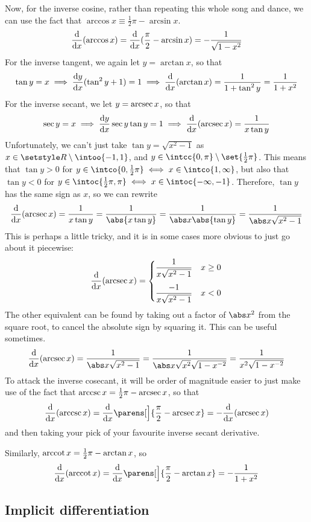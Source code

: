Now, for the inverse cosine, rather than repeating this whole song and
dance, we can use the fact that
\(\arccos x \equiv \frac 12 \pi - \arcsin x\).
\begin{equation*}
\dv{x}(\arccos x) = \dv{x}(\frac \pi 2 - \arcsin x)
    = -\frac 1{\sqrt{1 - x^2}}
\end{equation*}
For the inverse tangent, we again let \(y = \arctan x\), so that
\begin{equation*}
\tan y = x \implies \dv<y>{x}(\tan^2 y + 1) = 1
    \implies \dv{x}(\arctan x) = \frac 1{1 + \tan^2 y}
        = \frac 1{1 + x^2}
\end{equation*}
For the inverse secant, we let \(y = \operatorname{arcsec} x\), so that
\begin{equation*}
\sec y = x \implies \dv<y>{x} \sec y \tan y = 1
    \implies \dv{x}(\arcsec x) = \frac 1{x \tan y}
\end{equation*}
Unfortunately, we can't just take \(\tan y = \sqrt{x^2 - 1}\) as
\(x \in \Reals \setminus \intoo{-1, 1}\), and
\(y \in \intcc{0, \pi} \setminus \set{\frac 12 \pi}\). This means that
\(\tan y > 0\) for
\(y \in \intco{0, \frac 12 \pi} \iff x \in \intco{1, \infty}\), but also
that \(\tan y < 0\) for
\(y \in \intoc{\frac 12 \pi, \pi} \iff x \in \intoc{-\infty, -1}\).
Therefore, \(\tan y\) has the same sign as \(x\), so we can rewrite
\begin{equation*}
\dv{x}(\arcsec x) = \frac 1{x \tan y} = \frac 1{\abs{x \tan y}}
    = \frac 1{\abs x\abs{\tan y}} = \frac 1{\abs x\sqrt{x^2 - 1}}
\end{equation*}
This is perhaps a little tricky, and it is in some cases more obvious to
just go about it piecewise:
\begin{equation*}
\dv{x}(\arcsec x) = \begin{cases}
    \dfrac 1{x\sqrt{x^2 - 1}} & x \ge 0 \\[3ex]
    \dfrac {-1}{x\sqrt{x^2 - 1}} & x < 0
\end{cases}
\end{equation*}
The other equivalent can be found by taking out a factor of \(\abs x^2\)
from the square root, to cancel the absolute sign by squaring it. This can
be useful sometimes.
\begin{equation*}
\dv{x}(\arcsec x) = \frac 1{\abs x\sqrt{x^2 - 1}}
    = \frac 1{\abs x\sqrt{x^2}\sqrt{1 - x^{-2}}}
    = \frac 1{x^2\sqrt{1 - x^{-2}}}
\end{equation*}
To attack the inverse cosecant, it will be order of magnitude easier to just
make use of the fact that \(\operatorname{arccsc} x = \frac 12 \pi - \operatorname{arcsec} x\),
so that
\begin{equation*}
    \dv{x}(\arccsc x) = \dv{x}\parens[\Big]{\frac \pi 2 - \arcsec x}
                      = -\dv{x}(\arcsec x)
\end{equation*}
and then taking your pick of your favourite inverse secant derivative.

Similarly, \(\operatorname{arccot} x = \frac 12 \pi - \arctan x\), so
\begin{equation*}
    \dv{x}(\arccot x) = \dv{x}\parens[\Big]{\frac \pi 2 - \arctan x}
                      = -\frac 1{1 + x^2}
\end{equation*}

\subsection{Implicit differentiation}



